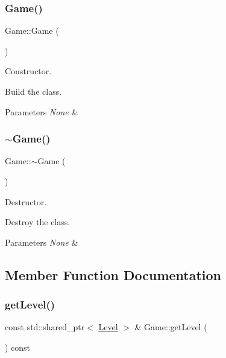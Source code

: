 \subsubsection{\texorpdfstring{Game()}{Game()}}
{\footnotesize\ttfamily Game\+::\+Game (\begin{DoxyParamCaption}{ }\end{DoxyParamCaption})}



Constructor. 

Build the class.


\begin{DoxyParams}{Parameters}
{\em None} & \\
\hline
\end{DoxyParams}
\mbox{\label{classGame_ae3d112ca6e0e55150d2fdbc704474530}} 
\subsubsection{\texorpdfstring{$\sim$\+Game()}{~Game()}}
{\footnotesize\ttfamily Game\+::$\sim$\+Game (\begin{DoxyParamCaption}{ }\end{DoxyParamCaption})}



Destructor. 

Destroy the class.


\begin{DoxyParams}{Parameters}
{\em None} & \\
\hline
\end{DoxyParams}


\subsection{Member Function Documentation}
\mbox{\label{classGame_aad97bed9ceadea4fcf802feaebc66947}} 
\subsubsection{\texorpdfstring{get\+Level()}{getLevel()}}
{\footnotesize\ttfamily const std\+::shared\+\_\+ptr$<$ \hyperlink{classLevel}{Level} $>$ \& Game\+::get\+Level (\begin{DoxyParamCaption}{ }\end{DoxyParamCaption}) const}



